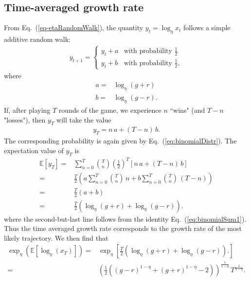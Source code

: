 \documentclass[11pt]{article}
\begin{document}
\begin{multicols}{2}
\section{Time-averaged growth rate}
From Eq.~(\ref{eq-etaRandomWalk}), the quantity $y_t = \log_\eta x_t$ follows a simple additive random walk:
\begin{align}
\label{eq-addRandomWalk}
y_{t+1} = \left\{ 
\begin{array}{ll}
y_t + a& \text{with probability $\frac{1}{2}$}\\
y_t + b  & \text{with probability $\frac{1}{2}$},
\end{array}
\right.
\end{align}
where 
\begin{align*}
a =& \log_\eta (g+r)\\
b = & \log_\eta (g-r). 
\end{align*}
If, after playing $T$ rounds of the game, we experience $n$ ``wins" (and $T-n$ "losses"), then $y_T$ will take the value
\begin{align*}
y_T =  n\, a + (T-n)\,b.
\end{align*}
The corresponding probability is again given by Eq.~(\ref{eq:binomialDistr}). 
The expectation value of $y_T$ is 
\begin{align}
\nonumber \mathbb{E}\left[y_T \right] =& \sum_{n=0}^T  {T \choose n} \left(\frac{1}{2}\right)^T  \left[ n\, a + (T-n)\,b \right] \\
\nonumber  = & \frac{T}{2} \left( a \sum_{n=0}^T {T \choose n} \,n + b \sum_{n=0}^T {T \choose n} \,(T-n)\right)\\
\nonumber =&  \frac{T}{2} \left(a  + b \right)\\
\label{eq-expectationyT} =&   \frac{T}{2} \left(\log_\eta(g+r)  + \log_\eta(g-r) \right).
\end{align}
where the second-but-last line follows from the identity Eq.~(\ref{eq:binomialSum1}).
Thus the time averaged growth rate corresponds to the growth rate of the most likely trajectory.
We then find that
\begin{align}
\nonumber \exp_\eta \left( \mathbb{E}\left[\log_\eta(x_T) \right]\right) = & \exp_\eta \left[  \frac{T}{2} \left(\log_\eta(g+r)  + \log_\eta(g-r) \right).\right]\\
= & \left(\frac{1}{2}  \left((g-r)^{1-\eta }+(g+r)^{1-\eta }-2\right)\right)^\frac{1}{1-\eta} \, T^\frac{1}{1-\eta}.
\end{align}


\end{multicols}
\end{document}
